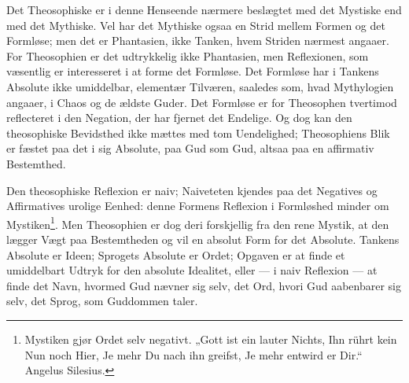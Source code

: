\documentclass[12pt]{book}
\newcommand{\opage}[1]{\marginnote{\footnotesize\textit{[#1]}}}
\begin{document}
Det Theosophiske er i denne Henseende nærmere beslægtet
med det Mystiske end med det Mythiske. Vel har det Mythiske
ogsaa en Strid mellem Formen og det Formløse; men
det er Phantasien, ikke Tanken, hvem Striden nærmest angaaer.
For Theosophien er det udtrykkelig ikke Phantasien, men Reflexionen,
som væsentlig er interesseret i at forme det Formløse.
Det Formløse har i Tankens Absolute ikke umiddelbar,
elementær Tilværen, saaledes som, hvad Mythylogien angaaer, %
i Chaos og de ældste Guder. Det Formløse er for Theosophen
tvertimod reflecteret i den Negation, der har fjernet
det Endelige. Og dog kan den theosophiske Bevidsthed ikke
mættes med tom Uendelighed; Theosophiens Blik er fæstet
paa det i sig Absolute, paa Gud som Gud, altsaa paa en
affirmativ Bestemthed.

Den theosophiske Reflexion er naiv; Naiveteten kjendes
paa det Negatives og Affirmatives urolige Eenhed: denne
\opage{87}Formens Reflexion i Formløshed minder om Mystiken\footnote{Mystiken gjør Ordet selv negativt. „Gott ist ein lauter Nichts,
Ihn rührt kein Nun noch Hier, Je mehr Du nach ihn greifst, Je
mehr entwird er Dir.“ Angelus Silesius.}. %
Men Theosophien er dog deri forskjellig fra den rene Mystik,
at den lægger Vægt paa Bestemtheden og vil en absolut Form
for det Absolute. Tankens Absolute er Ideen; Sprogets Absolute
er Ordet; Opgaven er at finde et umiddelbart Udtryk
for den absolute Idealitet, eller --- i naiv Reflexion --- at
finde det Navn, hvormed Gud nævner sig selv, det Ord, hvori
Gud aabenbarer sig selv, det Sprog, som Guddommen taler.
\end{document}
